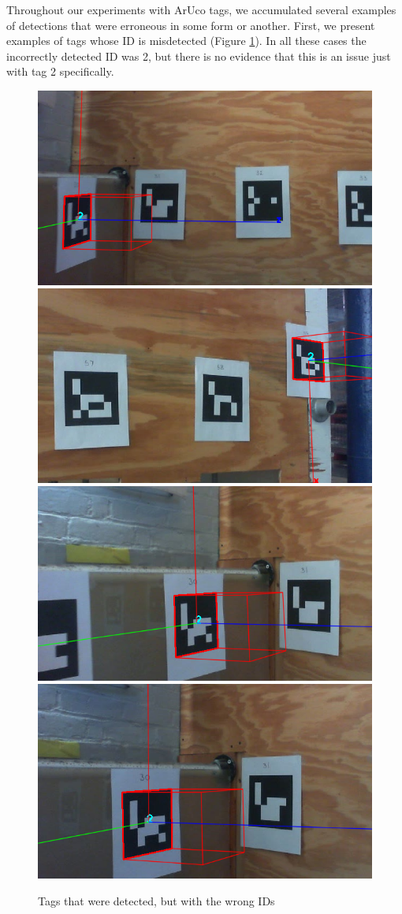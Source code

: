 \documentclass{article}
\begin{document}
    Throughout our experiments with ArUco tags, we accumulated several examples of detections that were erroneous in some form or another. First, we present examples of tags whose ID is misdetected (Figure \ref{fig:misdetected_tags}). In all these cases the incorrectly detected ID was 2, but there is no evidence that this is an issue just with tag 2 specifically.

    \begin{figure}[H]
      \centering
      \includegraphics[width=0.49\linewidth]{./images/misidentified_tag_1.png}
      \includegraphics[width=0.49\linewidth]{./images/misidentified_tag_2.png}
      \includegraphics[width=0.49\linewidth]{./images/misidentified_tag_3.png}
      \includegraphics[width=0.49\linewidth]{./images/misidentified_tag_4.png}
      \caption{Tags that were detected, but with the wrong IDs}
      \label{fig:misdetected_tags}
    \end{figure}
\end{document}

